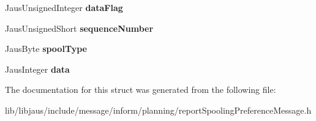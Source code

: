 \begin{DoxyCompactItemize}
\item 
\hypertarget{struct_report_spooling_preference_message_struct_a5318de8b933e829807528a7266543694}{\-Jaus\-Unsigned\-Integer {\bfseries data\-Flag}}\label{struct_report_spooling_preference_message_struct_a5318de8b933e829807528a7266543694}

\item 
\hypertarget{struct_report_spooling_preference_message_struct_a8c7f13ce856247a4bc19aefefc47c4ba}{\-Jaus\-Unsigned\-Short {\bfseries sequence\-Number}}\label{struct_report_spooling_preference_message_struct_a8c7f13ce856247a4bc19aefefc47c4ba}

\item 
\hypertarget{struct_report_spooling_preference_message_struct_a28a28350c70fe12e31fadcba3353736b}{\-Jaus\-Byte {\bfseries spool\-Type}}\label{struct_report_spooling_preference_message_struct_a28a28350c70fe12e31fadcba3353736b}

\item 
\hypertarget{struct_report_spooling_preference_message_struct_a17e1a4ec42d071448df0525fe366ff6d}{\-Jaus\-Integer {\bfseries data}}\label{struct_report_spooling_preference_message_struct_a17e1a4ec42d071448df0525fe366ff6d}

\end{DoxyCompactItemize}


\-The documentation for this struct was generated from the following file\-:\begin{DoxyCompactItemize}
\item 
lib/libjaus/include/message/inform/planning/report\-Spooling\-Preference\-Message.\-h\end{DoxyCompactItemize}
